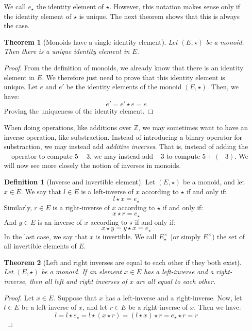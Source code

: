 \documentclass{article}
\newtheorem{theorem}{Theorem}[section]
\theoremstyle{definition}
\newtheorem{definition}{Definition}[section]
\theoremstyle{remark}
\theoremstyle{example}
\begin{document}
We call $e_\star$ the identity element of $\star$. However, this notation makes sense only if the identity element of $\star$ is unique. The next theorem shows that this is always the case.

\begin{theorem}[Monoids have a single identity element]
		Let $(E, \star)$ be a monoid. Then there is a unique identity element in $E$.
\end{theorem}

\begin{proof}
		From the definition of monoids, we already know that there is an identity element in $E$. We therefore just need to prove that this identity element is unique. Let $e$ and $e'$ be the identity elements of the monoid $(E, \star)$. Then, we have:
				$$e' = e' \star e = e$$
		Proving the uniqueness of the identity element.
\end{proof}

When doing operations, like additions over $\mathbb{Z}$, we may sometimes want to have an inverse operation, like substraction. Instead of introducing a binary operator for substraction, we may instead add \textit{additive inverses}. That is, instead of adding the $-$ operator to compute $5 - 3$, we may instead add $-3$ to compute $5 + (-3)$. We will now see more closely the notion of inverses in monoids.

\begin{definition}[Inverse and invertible element]
		Let $(E, \star)$ be a monoid, and let $x \in E$. We say that $l \in E$ is a left-inverse of $x$ according to $\star$ if and only if:
				$$l \star x = e_\star$$
		Similarly, $r \in E$ is a right-inverse of $x$ according to $\star$ if and only if:
				$$x \star r = e_\star$$
		And $y \in E$ is an inverse of $x$ according to $\star$ if and only if:
				$$x \star y = y \star x = e_\star$$
		In the last case, we say that $x$ is invertible. We call $E^\times_\star$ (or simply $E^\times$) the set of all invertible elements of $E$.
\end{definition}

\begin{theorem}[Left and right inverses are equal to each other if they both exist] %
		Let $(E, \star)$ be a monoid. If an element $x \in E$ has a left-inverse and a right-inverse, then all left and right inverses of $x$ are all equal to each other.
\end{theorem}

\begin{proof}
		Let $x \in E$. Suppose that $x$ has a left-inverse and a right-inverse. Now, let $l \in E$ be a left-inverse of $x$, and let $r \in E$ be a right-inverse of $x$. Then we have:
				$$l = l \star e_\star = l \star (x \star r) = (l \star x) \star r = e_\star \star r = r$$
\end{proof}
\end{document}
